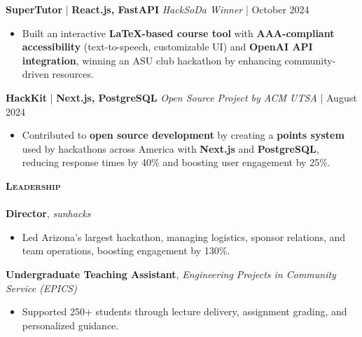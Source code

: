 \documentclass[10pt]{article}
\newcommand{\lineunder} {
    \vspace*{-8pt} \\
    \hspace*{-18pt} \hrulefill \\
}
\newcommand{\header} [1] {
    {\hspace*{-15pt}\vspace*{3pt} \textsc{#1}}
    \vspace*{-2pt} \lineunder
}
\begin{document}
\textbf{SuperTutor} | \textbf{React.js, FastAPI} \hfill \textit{HackSoDa Winner} | October 2024  \\
\vspace{-1mm}
\begin{itemize}[leftmargin=5mm, itemsep=0mm]
  \item Built an interactive \textbf{LaTeX-based course tool} with \textbf{AAA-compliant accessibility} (text-to-speech, customizable UI) and \textbf{OpenAI API integration}, winning an ASU club hackathon by enhancing community-driven resources.  \\
\end{itemize}
\textbf{HackKit} | \textbf{Next.js, PostgreSQL} \hfill \textit{Open Source Project by ACM UTSA} | August 2024  \\
\vspace{-1mm}
\begin{itemize}[leftmargin=5mm, itemsep=0mm]
  \item Contributed to \textbf{open source development} by creating a \textbf{points system} used by hackathons across America with \textbf{Next.js} and \textbf{PostgreSQL}, reducing response times by 40\% and boosting user engagement by 25\%.  \\
\end{itemize}
\header{\textbf{Leadership}}
\vspace{0.5mm}
\textbf{Director}, \textit{sunhacks} \\
\vspace{-1mm}
\begin{itemize}[leftmargin=5mm, itemsep=0mm]
  \item Led Arizona’s largest hackathon, managing logistics, sponsor relations, and team operations, boosting engagement by 130\%.
\end{itemize}
\textbf{Undergraduate Teaching Assistant}, \textit{Engineering Projects in Community Service (EPICS)} \\
\vspace{-1mm}
\begin{itemize}[leftmargin=5mm, itemsep=0mm]
  \item Supported 250+ students through lecture delivery, assignment grading, and personalized guidance.
\end{itemize}
\end{document}
